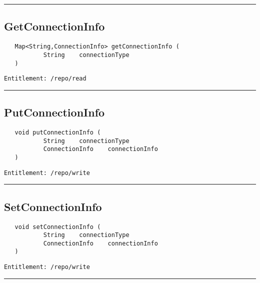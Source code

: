 \rule{12cm}{2pt}
\subsection{GetConnectionInfo}
\label{Api:GetConnectionInfo}
\begin{verbatim}
   Map<String,ConnectionInfo> getConnectionInfo (
           String    connectionType
   )
\end{verbatim}
\begin{Verbatim}[fontsize=\small, formatcom=\color{Maroon}]
  Entitlement: /repo/read
\end{Verbatim}



\rule{12cm}{2pt}
\subsection{PutConnectionInfo}
\label{Api:PutConnectionInfo}
\begin{verbatim}
   void putConnectionInfo (
           String    connectionType
           ConnectionInfo    connectionInfo
   )
\end{verbatim}
\begin{Verbatim}[fontsize=\small, formatcom=\color{Maroon}]
  Entitlement: /repo/write
\end{Verbatim}



\rule{12cm}{2pt}
\subsection{SetConnectionInfo}
\label{Api:SetConnectionInfo}
\begin{verbatim}
   void setConnectionInfo (
           String    connectionType
           ConnectionInfo    connectionInfo
   )
\end{verbatim}
\begin{Verbatim}[fontsize=\small, formatcom=\color{Maroon}]
  Entitlement: /repo/write
\end{Verbatim}



\rule{12cm}{2pt}
